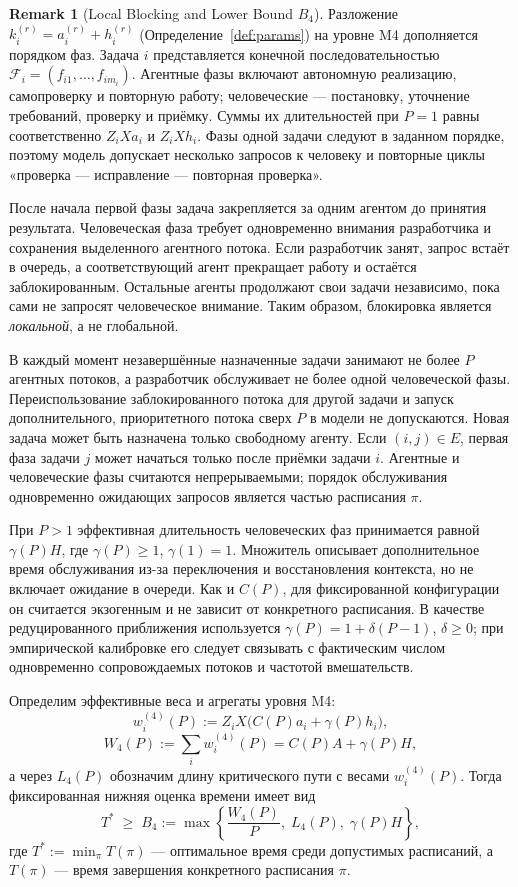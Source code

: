 \documentclass[12pt,a4paper]{article}
\theoremstyle{definition}
\newtheorem{remark}{Remark}
\begin{document}
\begin{remark}[Local Blocking and Lower Bound $B_4$]\label{rem:human}
Разложение $k_i^{(r)} = a_i^{(r)} + h_i^{(r)}$ (Определение~\ref{def:params}) на уровне M4 дополняется порядком фаз. Задача $i$ представляется конечной последовательностью $\mathcal F_i=(f_{i1},\dots,f_{im_i})$. Агентные фазы включают автономную реализацию, самопроверку и повторную работу; человеческие --- постановку, уточнение требований, проверку и приёмку. Суммы их длительностей при $P=1$ равны соответственно $Z_iXa_i$ и $Z_iXh_i$. Фазы одной задачи следуют в заданном порядке, поэтому модель допускает несколько запросов к человеку и повторные циклы «проверка --- исправление --- повторная проверка».

После начала первой фазы задача закрепляется за одним агентом до принятия результата. Человеческая фаза требует одновременно внимания разработчика и сохранения выделенного агентного потока. Если разработчик занят, запрос встаёт в очередь, а соответствующий агент прекращает работу и остаётся заблокированным. Остальные агенты продолжают свои задачи независимо, пока сами не запросят человеческое внимание. Таким образом, блокировка является \emph{локальной}, а не глобальной.

В каждый момент незавершённые назначенные задачи занимают не более $P$ агентных потоков, а разработчик обслуживает не более одной человеческой фазы. Переиспользование заблокированного потока для другой задачи и запуск дополнительного, приоритетного потока сверх $P$ в модели не допускаются. Новая задача может быть назначена только свободному агенту.
Если $(i,j)\in E$, первая фаза задачи $j$ может начаться только после приёмки
задачи $i$. Агентные и человеческие фазы считаются непрерываемыми; порядок
обслуживания одновременно ожидающих запросов является частью расписания $\pi$.

При $P>1$ эффективная длительность человеческих фаз принимается равной $\gamma(P)H$, где $\gamma(P)\ge1$, $\gamma(1)=1$. Множитель описывает дополнительное время обслуживания из-за переключения и восстановления контекста, но не включает ожидание в очереди. Как и $C(P)$, для фиксированной конфигурации он считается экзогенным и не зависит от конкретного расписания. В качестве редуцированного приближения используется $\gamma(P)=1+\delta(P-1)$, $\delta\ge0$; при эмпирической калибровке его следует связывать с фактическим числом одновременно сопровождаемых потоков и частотой вмешательств.

Определим эффективные веса и агрегаты уровня M4:
\[
  w_i^{(4)}(P):=Z_iX\bigl(C(P)a_i+\gamma(P)h_i\bigr),
\]
\[
  W_4(P):=\sum_iw_i^{(4)}(P)=C(P)A+\gamma(P)H,
\]
а через $L_4(P)$ обозначим длину критического пути с весами $w_i^{(4)}(P)$. Тогда фиксированная нижняя оценка времени имеет вид
\[
  T^{*} \;\ge\; B_4 := \max\left\{ \frac{W_4(P)}{P},\; L_4(P),\; \gamma(P)H \right\},
\]
где $T^{*}:=\min_{\pi}T(\pi)$ --- оптимальное время среди допустимых расписаний, а $T(\pi)$ --- время завершения конкретного расписания $\pi$.


\end{remark}
\end{document}

